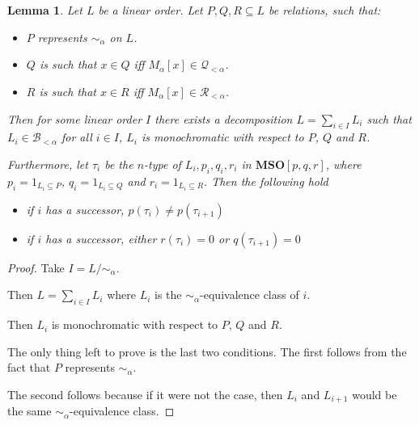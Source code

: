 \documentclass{article}
\newtheorem{lemma}{Lemma}
\newcommand{\mso}{\mathbf{MSO}}
\begin{document}
\begin{lemma}
  Let $L$ be a linear order. Let $P, Q, R \subseteq L$ be relations, such that:

  \begin{itemize}
    \item $P$ represents $\sim_{\alpha}$ on $L$.
    \item $Q$ is such that $x \in Q$ iff $M_{\alpha}[x] \in \mathcal{Q}_{< \alpha}$.
    \item $R$ is such that $x \in R$ iff $M_{\alpha}[x] \in \mathcal{R}_{< \alpha}$.
  \end{itemize}

  Then for some linear order $I$ there exists a decomposition
  $L = \sum_{i \in I} L_i$ such that $L_i \in \mathcal{B}_{< \alpha}$ for all $i \in I$,
  $L_i$ is monochromatic with respect to $P$, $Q$ and $R$.

  Furthermore, let $\tau_i$ be the $n$-type of $L_i, p_i, q_i, r_i$ in $\mso[p, q, r]$,
  where $p_i = 1_{L_i \subseteq P}$, $q_i = 1_{L_i \subseteq Q}$ and $r_i = 1_{L_i \subseteq R}$.
  Then the following hold
  \begin{itemize}
    \item if $i$ has a successor, $p(\tau_i) \ne p(\tau_{i+1})$
    \item if $i$ has a successor, either $r(\tau_i) = 0$ or $q(\tau_{i+1}) = 0$
  \end{itemize}
\end{lemma}
\begin{proof}
  Take $I = L / \sim_{\alpha}$.

  Then $L = \sum_{i \in I} L_i$ where $L_i$ is the $\sim_{\alpha}$-equivalence class of $i$.

  Then $L_i$ is monochromatic with respect to $P$, $Q$ and $R$.

  The only thing left to prove is the last two conditions. The first follows from
  the fact that $P$ represents $\sim_{\alpha}$.

  The second follows because if it were not the case, then $L_i$ and $L_{i+1}$ would
  be the same $\sim_{\alpha}$-equivalence class.
\end{proof}
\end{document}
